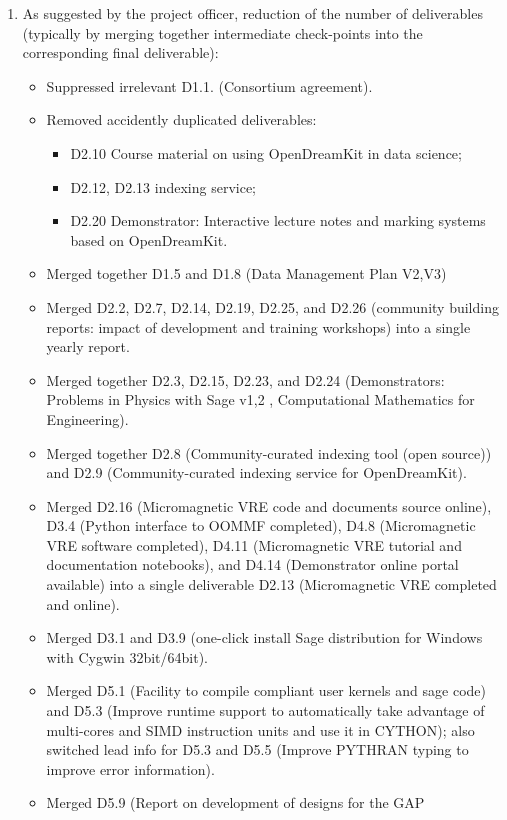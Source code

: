 \begin{enumerate}
\item As suggested by the project officer, reduction of the number of
  deliverables (typically by merging together intermediate
  check-points into the corresponding final deliverable):
  \begin{itemize}
  \item Suppressed irrelevant D1.1. (Consortium agreement).
  \item Removed accidently duplicated deliverables:
    \begin{itemize}
    \item D2.10 Course material on using OpenDreamKit in data science;
    \item D2.12, D2.13 indexing service;
    \item D2.20 Demonstrator: Interactive lecture notes and marking
      systems based on OpenDreamKit.
    \end{itemize}
  \item Merged together D1.5 and D1.8 (Data Management Plan V2,V3)
  \item Merged D2.2, D2.7, D2.14, D2.19, D2.25, and D2.26 (community
    building reports: impact of development and training workshops)
    into a single yearly report.
  \item Merged together D2.3, D2.15, D2.23, and D2.24 (Demonstrators:
    Problems in Physics with Sage v1,2 , Computational Mathematics for
    Engineering).
  \item Merged together D2.8 (Community-curated indexing tool (open
    source)) and D2.9 (Community-curated indexing service for
    OpenDreamKit).
  \item Merged D2.16 (Micromagnetic VRE code and documents source
    online), D3.4 (Python interface to OOMMF completed), D4.8
    (Micromagnetic VRE software completed), D4.11 (Micromagnetic VRE
    tutorial and documentation notebooks), and D4.14 (Demonstrator
    online portal available) into a single deliverable D2.13
    (Micromagnetic VRE completed and online).
  \item Merged D3.1 and D3.9 (one-click install Sage distribution for
    Windows with Cygwin 32bit/64bit).
  \item Merged D5.1 (Facility to compile \Pythran compliant user
    kernels and sage code) and D5.3 (Improve \Pythran runtime support
    to automatically take advantage of multi-cores and SIMD
    instruction units and use it in CYTHON); also switched lead info
    for D5.3 and D5.5 (Improve PYTHRAN typing to improve error
    information).
  \item Merged D5.9 (Report on development of designs for the GAP

\end{itemize}
\end{enumerate}
